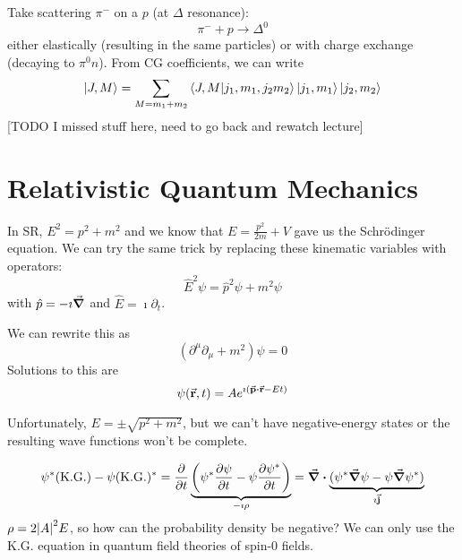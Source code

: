 \documentclass[a4paper,twoside,master.tex]{subfiles}
\begin{document}
Take scattering $ \pi^- $ on a $ p $ (at $ \Delta $ resonance):
\begin{equation}
    \pi^- + p \to \Delta^0
\end{equation}
either elastically (resulting in the same particles) or with charge exchange (decaying to $ \pi^0 n $). From CG coefficients, we can write
\begin{equation}
    \ket{J,M} = \sum_{M=m_1 + m_2}\bra{J,M}\ket{j_1, m_1, j_2 m_2}\ket{j_1, m_1}\ket{j_2, m_2}
\end{equation}
[TODO I missed stuff here, need to go back and rewatch lecture]

\section{Relativistic Quantum Mechanics}\label{sec:relativistic_quantum_mechanics}

In SR, $ E^2 = p^2 + m^2 $ and we know that $ E = \frac{p^2}{2m} + V $ gave us the Schr\"odinger equation. We can try the same trick by replacing these kinematic variables with operators:
\begin{equation}
    \hat{E}^2 \psi = \hat{p}^2 \psi + m^2 \psi
\end{equation}
with $ \hat{p} = - \imath \grad $ and $ \hat{E} = \imath \partial_t $.

We can rewrite this as
\begin{equation}
    (\partial^{\mu} \partial_{\mu} + m^2) \psi = 0 \tag{Klein-Gordon Equation}
\end{equation}
Solutions to this are
\begin{equation}
    \psi(\va{r}, t) = A e^{\imath (\va{p} \vdot \va{r} - E t)}
\end{equation}

Unfortunately, $ E = \pm \sqrt{p^2 + m^2} $, but we can't have negative-energy states or the resulting wave functions won't be complete.

\begin{equation}
    \psi^* (\text{K.G.}) - \psi (\text{K.G.})^* = \pdv{t}\underbrace{\left( \psi^* \pdv{\psi}{t} - \psi \pdv{\psi^*}{t} \right)}_{- \imath \rho} = \div{\underbrace{(\psi^* \grad{\psi} - \psi \grad{\psi^*})}_{\imath \va{j}}}
\end{equation}
$ \rho = 2 \abs{A}^2 E $, so how can the probability density be negative? We can only use the K.G. equation in quantum field theories of spin-0 fields.
\end{document}
